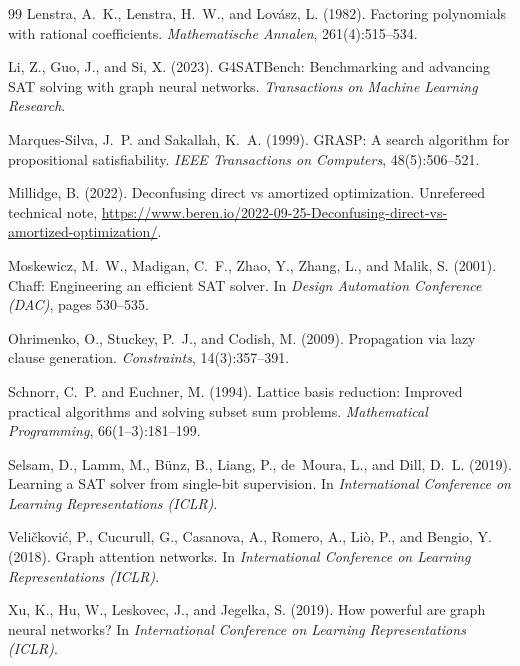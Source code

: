 \documentclass[12pt]{article}
\begin{document}
\begin{thebibliography}{99}
Lenstra, A.~K., Lenstra, H.~W., and Lov\'asz, L. (1982).
Factoring polynomials with rational coefficients.
\emph{Mathematische Annalen}, 261(4):515--534.

Li, Z., Guo, J., and Si, X. (2023).
G4SATBench: Benchmarking and advancing SAT solving with graph neural networks.
\emph{Transactions on Machine Learning Research}.

Marques-Silva, J.~P. and Sakallah, K.~A. (1999).
GRASP: A search algorithm for propositional satisfiability.
\emph{IEEE Transactions on Computers}, 48(5):506--521.

Millidge, B. (2022).
Deconfusing direct vs amortized optimization.
Unrefereed technical note, \url{https://www.beren.io/2022-09-25-Deconfusing-direct-vs-amortized-optimization/}.

Moskewicz, M.~W., Madigan, C.~F., Zhao, Y., Zhang, L., and Malik, S. (2001).
Chaff: Engineering an efficient SAT solver.
In \emph{Design Automation Conference (DAC)}, pages 530--535.

Ohrimenko, O., Stuckey, P.~J., and Codish, M. (2009).
Propagation via lazy clause generation.
\emph{Constraints}, 14(3):357--391.

Schnorr, C.~P. and Euchner, M. (1994).
Lattice basis reduction: Improved practical algorithms and solving subset sum problems.
\emph{Mathematical Programming}, 66(1--3):181--199.

Selsam, D., Lamm, M., B\"unz, B., Liang, P., de~Moura, L., and Dill, D.~L. (2019).
Learning a SAT solver from single-bit supervision.
In \emph{International Conference on Learning Representations (ICLR)}.

Veli\v{c}kovi\'c, P., Cucurull, G., Casanova, A., Romero, A., Li\`o, P., and Bengio, Y. (2018).
Graph attention networks.
In \emph{International Conference on Learning Representations (ICLR)}.

Xu, K., Hu, W., Leskovec, J., and Jegelka, S. (2019).
How powerful are graph neural networks?
In \emph{International Conference on Learning Representations (ICLR)}.

\end{thebibliography}
\end{document}

